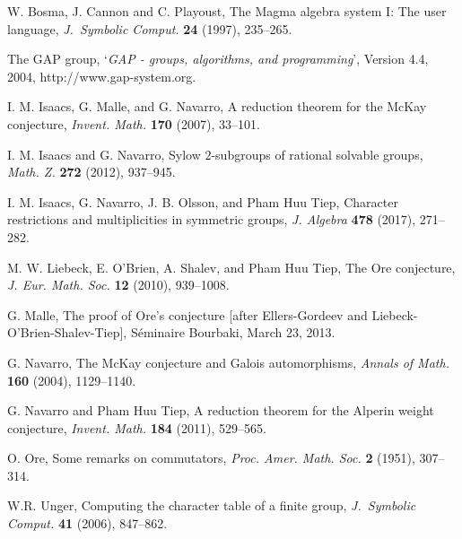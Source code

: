 \begin{thebibliography}{ABCD}

 W. Bosma, J. Cannon and 
 C. Playoust,
The {\sc Magma} algebra system I: The user language,
\emph{J.\ Symbolic Comput.} {\bf 24} (1997), 235--265.   

The GAP group, `{\it {\sf GAP} - groups, algorithms, and
programming}', Version 4.4, 
2004,
{\sf http://www.gap-system.org}.

  I. M. Isaacs, G. Malle, and G. Navarro, A reduction theorem for the
McKay conjecture, {\it Invent. Math.} {\bf 170} (2007), 33--101.

  I. M. Isaacs and G. Navarro, Sylow $2$-subgroups of rational solvable groups, {\it Math. Z.} {\bf 272} (2012), 937--945.
  
  I. M. Isaacs, G. Navarro, J. B. Olsson, and Pham Huu Tiep, Character restrictions and multiplicities in symmetric groups, 
{\it J. Algebra} {\bf 478} (2017), 271--282.

  M. W. Liebeck, E. O'Brien, A. Shalev, and Pham Huu Tiep,
The Ore conjecture, {\it J. Eur. Math. Soc.} {\bf 12} (2010), 939--1008.

  G. Malle, The proof of Ore's conjecture [after Ellers-Gordeev and 
Liebeck-O'Brien-Shalev-Tiep], S\'eminaire  Bourbaki, March 23, 2013.

  G. Navarro, The McKay conjecture
and Galois automorphisms, {\it Annals of Math.} {\bf 160} (2004), 1129--1140.

  G. Navarro and Pham Huu Tiep, A reduction theorem for the
Alperin weight conjecture, {\it Invent. Math.} {\bf 184} (2011), 529--565.

 O. Ore, Some remarks on commutators, 
{\it Proc. Amer. Math. Soc.} {\bf 2} (1951), 307--314. 

 W.R. Unger,
Computing the character table of a finite group,
{\it J.\ Symbolic Comput.}  {\bf 41}  (2006),  847--862.

\end{thebibliography}
\fi
%







